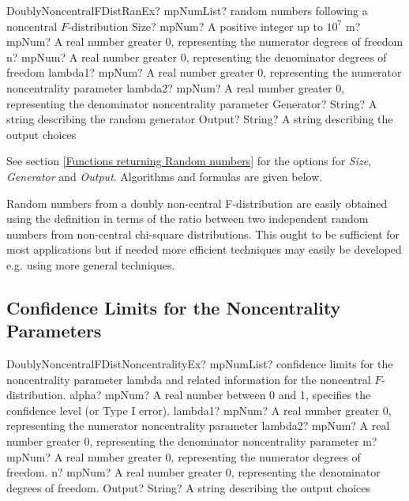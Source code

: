 \begin{mpFunctionsExtract}
	\mpFunctionSixNotImplemented
	{DoublyNoncentralFDistRanEx? mpNumList? random numbers following a noncentral $F$-distribution}
	{Size? mpNum? A positive integer up to $10^7$}
	{m? mpNum? A real number greater 0, representing the numerator  degrees of freedom}
	{n? mpNum? A real number greater 0, representing the denominator degrees of freedom}
	{lambda1? mpNum? A real number greater 0, representing the numerator noncentrality parameter}
	{lambda2? mpNum? A real number greater 0, representing the denominator noncentrality parameter}
	{Generator? String? A string describing the random generator}
	{Output? String? A string describing the output choices}
\end{mpFunctionsExtract}

\vspace{0.3cm}
See section \ref{Functions returning Random numbers} for the options for  {\itshape\sffamily Size},  {\itshape\sffamily Generator} and {\itshape\sffamily Output}. Algorithms and formulas are given below.


\vspace{0.3cm}
Random numbers from a doubly non-central F-distribution are easily obtained using the definition in terms of the ratio between two independent random numbers from non-central chi-square distributions. This ought to be sufficient for most applications but if needed more efficient techniques may easily be developed e.g. using more general techniques.



\subsection{Confidence Limits for the Noncentrality Parameters}
\label{DoublyNoncentralFNoncentrality}

\begin{mpFunctionsExtract}
	\mpFunctionSixNotImplemented
	{DoublyNoncentralFDistNoncentralityEx? mpNumList? confidence limits for the noncentrality parameter lambda and related information for the noncentral $F$-distribution.}
	{alpha? mpNum? A real number between 0 and 1, specifies the confidence level (or Type I error).}
	{lambda1? mpNum? A real number greater 0, representing the numerator noncentrality parameter}
	{lambda2? mpNum? A real number greater 0, representing the denominator noncentrality parameter}
	{m? mpNum? A real number greater 0, representing the numerator  degrees of freedom.}
	{n? mpNum? A real number greater 0, representing the denominator degrees of freedom.}
	{Output? String? A string describing the output choices}
\end{mpFunctionsExtract}


